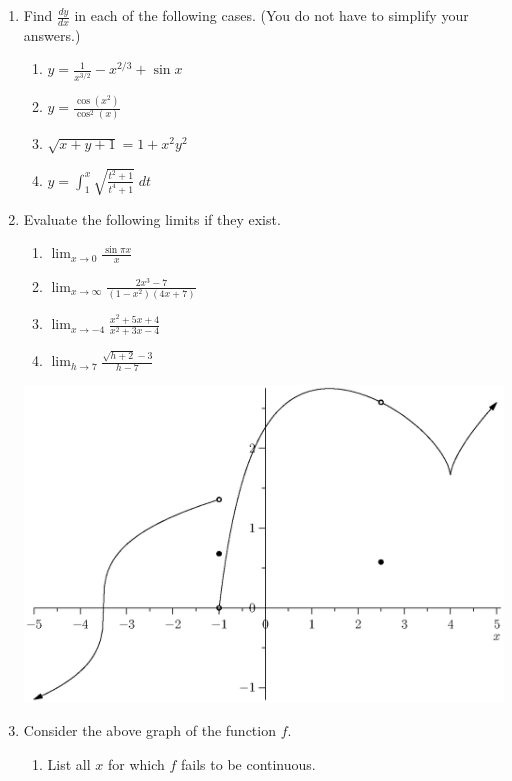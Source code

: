 \documentclass[12pt]{article}
\newcommand{\ds}{\displaystyle}
\begin{document}
\begin{enumerate}
\item Find
  $\ds \frac{dy}{dx}$ in each of the following cases.  (You do not have
  to simplify your answers.)
  \begin{enumerate}
  \item $\ds y = \frac{1}{x^{3/2}} - x^{2/3} + \sin x$
\vfill
  \item $\ds y = \frac{\cos(x^2)}{\cos^2(x)}$
\vfill
  \item $\ds \sqrt{x+y+1} = 1 + x^2y^2$
\vfill
  \item $\ds y = \int_1^x \sqrt{\frac{t^2+1}{t^4+1}} \; dt$
\vfill
  \end{enumerate}
\newpage
\item Evaluate
  the following limits if they exist.
  \begin{enumerate}
  \item $\ds \lim_{x\to 0} \frac{\sin \pi x}{x}$
\vfill
  \item $\ds \lim_{x\to \infty} \frac{2x^3-7}{(1-x^2)(4x+7)}$
\vfill
  \item $\ds \lim_{x\to -4} \frac{x^2+5x+4}{x^2+3x-4}$
\vfill
  \item $\ds \lim_{h\to 7} \frac{\sqrt{h+2}-3}{h-7}$
\vfill
  \end{enumerate}
\newpage
  \begin{center}
    \includegraphics[width=6in]{grph.eps}
  \end{center}
\item Consider 
  the above graph of the function $f$.
  \begin{enumerate}
  \item List all $x$ for which $f$ fails to be continuous.

\end{enumerate}
\end{enumerate}
\end{document}
